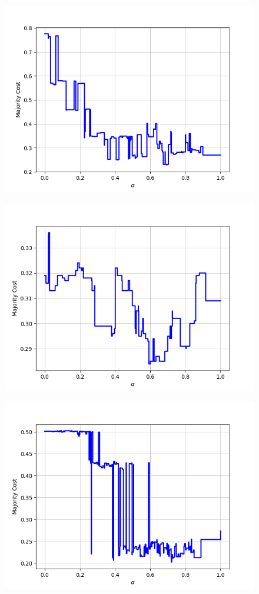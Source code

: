 \begin{figure}[h]
\begin{minipage}{.24\textwidth}
  {\includegraphics[width=\linewidth]{plots/nell-ac/bodypart}}
\end{minipage}
\begin{minipage}{.24\textwidth}
  \centering
  {\includegraphics[width=\linewidth]{plots/nell-ac/building}}
\end{minipage}
\begin{minipage}{.24\textwidth}
  \centering
  {\includegraphics[width=\linewidth]{plots/nell-ac/company}}

\end{minipage}
\end{figure}
